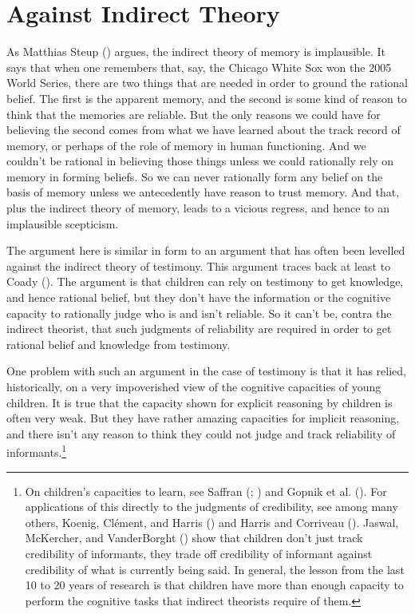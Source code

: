 \documentclass[
  10pt,
  letterpaper,
  DIV=11,
  numbers=noendperiod,
  twoside]{scrartcl}
\begin{document}
\section{Against Indirect Theory}\label{againstindirecttheory}

As Matthias Steup () argues, the indirect
theory of memory is implausible. It says that when one remembers that,
say, the Chicago White Sox won the 2005 World Series, there are two
things that are needed in order to ground the rational belief. The first
is the apparent memory, and the second is some kind of reason to think
that the memories are reliable. But the only reasons we could have for
believing the second comes from what we have learned about the track
record of memory, or perhaps of the role of memory in human functioning.
And we couldn't be rational in believing those things unless we could
rationally rely on memory in forming beliefs. So we can never rationally
form any belief on the basis of memory unless we antecedently have
reason to trust memory. And that, plus the indirect theory of memory,
leads to a vicious regress, and hence to an implausible scepticism.

The argument here is similar in form to an argument that has often been
levelled against the indirect theory of testimony. This argument traces
back at least to Coady (). The argument is
that children can rely on testimony to get knowledge, and hence rational
belief, but they don't have the information or the cognitive capacity to
rationally judge who is and isn't reliable. So it can't be, contra the
indirect theorist, that such judgments of reliability are required in
order to get rational belief and knowledge from testimony.

One problem with such an argument in the case of testimony is that it
has relied, historically, on a very impoverished view of the cognitive
capacities of young children. It is true that the capacity shown for
explicit reasoning by children is often very weak. But they have rather
amazing capacities for implicit reasoning, and there isn't any reason to
think they could not judge and track reliability of
informants.\footnote{On children's capacities to learn, see Saffran
  (; )
  and Gopnik et al. (). For applications
  of this directly to the judgments of credibility, see among many
  others, Koenig, Clément, and Harris
  () and Harris and
  Corriveau (). Jaswal,
  McKercher, and VanderBorght () show
  that children don't just track credibility of informants, they trade
  off credibility of informant against credibility of what is currently
  being said. In general, the lesson from the last 10 to 20 years of
  research is that children have more than enough capacity to perform
  the cognitive tasks that indirect theorists require of them.}
\end{document}
